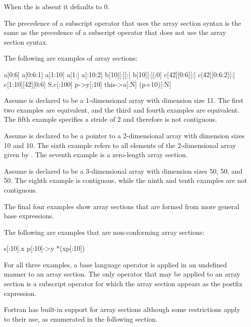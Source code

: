 \begin{ccppspecific}
When the  is absent it defaults to 0.

The precedence of a subscript operator that uses the array section syntax is
the same as the precedence of a subscript operator that does not use the
array section syntax.

\begin{note}
The following are examples of array sections:

\begin{indentedcodelist}
a[0:6]
a[0:6:1]
a[1:10]
a[1:]
a[:10:2]
b[10][:][:]
b[10][:][:0]
c[42][0:6][:]
c[42][0:6:2][:]
c[1:10][42][0:6]
S.c[:100]
p->y[:10]
this->a[:N]
(p+10)[:N]
\end{indentedcodelist}

Assume  is declared to be a 1-dimensional array with dimension size
11.  The first two examples are equivalent, and the third and fourth
examples are equivalent. The fifth example specifies a stride of 2 and
therefore is not contiguous.

Assume  is declared to be a pointer to a 2-dimensional array with
dimension sizes 10 and 10. The sixth example refers to all elements of the
2-dimensional array given by . The seventh
example is a zero-length array section.

Assume  is declared to be a 3-dimensional array with dimension sizes
50, 50, and 50.  The eighth example is contiguous, while the ninth and
tenth examples are not contiguous.

The final four examples show array sections that are formed from
more general base expressions.

The following are examples that are non-conforming array sections:

\begin{indentedcodelist}
s[:10].x
p[:10]->y
*(xp[:10])
\end{indentedcodelist}

For all three examples, a base language operator is applied in an undefined
manner to an array section. The only operator that may be applied to an array
section is a subscript operator for which the array section appears as the
postfix expression.
\end{note}
\medskip
\end{ccppspecific}

\begin{fortranspecific}
Fortran has built-in support for array sections although some
restrictions apply to their use, as enumerated in the following section.
\end{fortranspecific}

